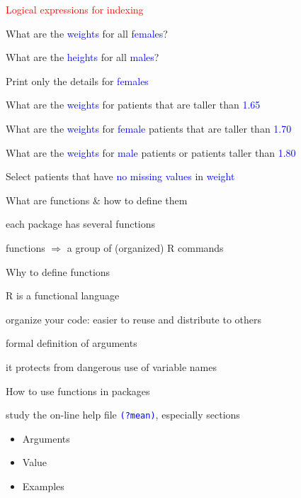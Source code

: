 \documentclass{presentatiesmetlogo}
\newcommand{\code}[1]{\textcolor{blue}{\texttt{#1}}}
\newcommand{\R}{{\textsf{R} }}
\let \nl = \newline
\begin{document}
\bitem
\item \textcolor{red}{Logical expressions for indexing}
\bitemt
\item What are the \textcolor{blue}{weights} for all \textcolor{blue}{females}?
\item What are the \textcolor{blue}{heights} for all \textcolor{blue}{males}?
\item Print only the details for \textcolor{blue}{females}
\item What are the \textcolor{blue}{weights} for patients that are taller than \textcolor{blue}{1.65}
\item What are the \textcolor{blue}{weights} for \textcolor{blue}{female} patients that are taller than \textcolor{blue}{1.70}
\item What are the \textcolor{blue}{weights} for \textcolor{blue}{male} patients or patients taller than \textcolor{blue}{1.80}
\item Select patients that have \textcolor{blue}{no missing values} in \textcolor{blue}{weight}
\item {}
\eitemt
\eitem
\bitem
\item What are functions \& how to define them
\bitemt
\item each package has several functions
\item functions $\Rightarrow$ a group of (organized) \R commands
\nl
\eitemt
\item Why to define functions
\bitemt
\item \R is a functional language
\item organize your code: easier to reuse and distribute to others
\item formal definition of arguments
\item it protects from dangerous use of variable names
\nl
\eitemt
\eitem
\bitem
\item How to use functions in packages
\bitemt
\item study the on-line help file \code{(?mean)}, especially sections
\renewcommand{\labelitemi}{*}
\begin{itemize}
\item Arguments
\item Value
\item Examples
\nl
\end{itemize}
\end{document}
